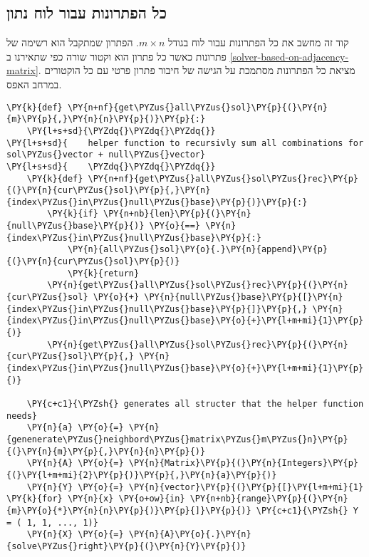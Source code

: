\hypertarget{all-solution}{%
\subsection{כל הפתרונות עבור לוח נתון}\label{all-solution}}
קוד זה מחשב את כל הפתרונות עבור לוח בגודל
$m\times n$.
הפתרון שמתקבל הוא רשימה של פתרונות כאשר כל פתרון 
הוא וקטור שורה כפי שתאירנו 
ב
\ref{solver-based-on-adjacency-matrix}.
מציאת כל הפתרונות מסתמכת על הגישה של חיבור פתרון פרטי עם 
כל הוקטורים במרחב האפס.
\begin{english}
    \begin{tcolorbox}[breakable, size=fbox, boxrule=1pt, pad at break*=1mm,colback=cellbackground, colframe=cellborder]
\begin{Verbatim}[commandchars=\\\{\}]
\PY{k}{def} \PY{n+nf}{get\PYZus{}all\PYZus{}sol}\PY{p}{(}\PY{n}{m}\PY{p}{,}\PY{n}{n}\PY{p}{)}\PY{p}{:}
    \PY{l+s+sd}{\PYZdq{}\PYZdq{}\PYZdq{}}
\PY{l+s+sd}{    helper function to recursivly sum all combinations for sol\PYZus{}vector + null\PYZus{}vector}
\PY{l+s+sd}{    \PYZdq{}\PYZdq{}\PYZdq{}} 
    \PY{k}{def} \PY{n+nf}{get\PYZus{}all\PYZus{}sol\PYZus{}rec}\PY{p}{(}\PY{n}{cur\PYZus{}sol}\PY{p}{,}\PY{n}{index\PYZus{}in\PYZus{}null\PYZus{}base}\PY{p}{)}\PY{p}{:}
        \PY{k}{if} \PY{n+nb}{len}\PY{p}{(}\PY{n}{null\PYZus{}base}\PY{p}{)} \PY{o}{==} \PY{n}{index\PYZus{}in\PYZus{}null\PYZus{}base}\PY{p}{:}
            \PY{n}{all\PYZus{}sol}\PY{o}{.}\PY{n}{append}\PY{p}{(}\PY{n}{cur\PYZus{}sol}\PY{p}{)}
            \PY{k}{return}
        \PY{n}{get\PYZus{}all\PYZus{}sol\PYZus{}rec}\PY{p}{(}\PY{n}{cur\PYZus{}sol} \PY{o}{+} \PY{n}{null\PYZus{}base}\PY{p}{[}\PY{n}{index\PYZus{}in\PYZus{}null\PYZus{}base}\PY{p}{]}\PY{p}{,} \PY{n}{index\PYZus{}in\PYZus{}null\PYZus{}base}\PY{o}{+}\PY{l+m+mi}{1}\PY{p}{)}
        \PY{n}{get\PYZus{}all\PYZus{}sol\PYZus{}rec}\PY{p}{(}\PY{n}{cur\PYZus{}sol}\PY{p}{,} \PY{n}{index\PYZus{}in\PYZus{}null\PYZus{}base}\PY{o}{+}\PY{l+m+mi}{1}\PY{p}{)}
    
    \PY{c+c1}{\PYZsh{} generates all structer that the helper function needs}
    \PY{n}{a} \PY{o}{=} \PY{n}{genenerate\PYZus{}neighbord\PYZus{}matrix\PYZus{}m\PYZus{}n}\PY{p}{(}\PY{n}{m}\PY{p}{,}\PY{n}{n}\PY{p}{)}
    \PY{n}{A} \PY{o}{=} \PY{n}{Matrix}\PY{p}{(}\PY{n}{Integers}\PY{p}{(}\PY{l+m+mi}{2}\PY{p}{)}\PY{p}{,}\PY{n}{a}\PY{p}{)}
    \PY{n}{Y} \PY{o}{=} \PY{n}{vector}\PY{p}{(}\PY{p}{[}\PY{l+m+mi}{1} \PY{k}{for} \PY{n}{x} \PY{o+ow}{in} \PY{n+nb}{range}\PY{p}{(}\PY{n}{m}\PY{o}{*}\PY{n}{n}\PY{p}{)}\PY{p}{]}\PY{p}{)} \PY{c+c1}{\PYZsh{} Y = ( 1, 1, ..., 1)}
    \PY{n}{X} \PY{o}{=} \PY{n}{A}\PY{o}{.}\PY{n}{solve\PYZus{}right}\PY{p}{(}\PY{n}{Y}\PY{p}{)}


\end{Verbatim}
\end{tcolorbox}
\end{english}
